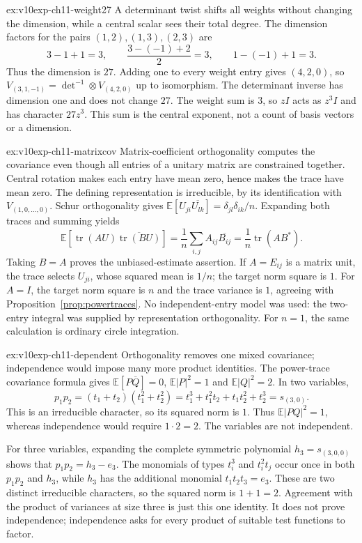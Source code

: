 \begin{solution}{ex:v10exp-ch11-weight27}
\idea A determinant twist shifts all weights without changing the dimension, while a central scalar sees their total degree.
\writeup The dimension factors for the pairs $(1,2),(1,3),(2,3)$ are
\[
 3-1+1=3,\qquad\frac{3-(-1)+2}{2}=3,\qquad1-(-1)+1=3.
\]
Thus the dimension is $27$. Adding one to every weight entry gives $(4,2,0)$, so $V_{(3,1,-1)}=\det^{-1}\otimes V_{(4,2,0)}$ up to isomorphism. The determinant inverse has dimension one and does not change $27$. The weight sum is $3$, so $zI$ acts as $z^3I$ and has character $27z^3$. This sum is the central exponent, not a count of basis vectors or a dimension.
\end{solution}

\begin{solution}{ex:v10exp-ch11-matrixcov}
\idea Matrix-coefficient orthogonality computes the covariance even though all entries of a unitary matrix are constrained together.
\writeup Central rotation makes each entry have mean zero, hence makes the trace have mean zero. The defining representation is irreducible, by its identification with $V_{(1,0,\ldots,0)}$. Schur orthogonality gives
$\mathbb E[U_{ji}\overline{U_{lk}}]=\delta_{jl}\delta_{ik}/n$. Expanding both traces and summing yields
\[
 \mathbb E[\operatorname{tr}(AU)\overline{\operatorname{tr}(BU)}]
  =\frac1n\sum_{i,j}A_{ij}\overline{B_{ij}}
  =\frac1n\operatorname{tr}(AB^*).
\]
Taking $B=A$ proves the unbiased-estimate assertion. If $A=E_{ij}$ is a matrix unit, the trace selects $U_{ji}$, whose squared mean is $1/n$; the target norm square is $1$. For $A=I$, the target norm square is $n$ and the trace variance is $1$, agreeing with Proposition~\ref{prop:powertraces}. No independent-entry model was used: the two-entry integral was supplied by representation orthogonality. For $n=1$, the same calculation is ordinary circle integration.
\end{solution}

\begin{solution}{ex:v10exp-ch11-dependent}
\idea Orthogonality removes one mixed covariance; independence would impose many more product identities.
\writeup The power-trace covariance formula gives $\mathbb E[P\overline Q]=0$, $\mathbb E|P|^2=1$ and $\mathbb E|Q|^2=2$. In two variables,
\[
 p_1p_2=(t_1+t_2)(t_1^2+t_2^2)
   =t_1^3+t_1^2t_2+t_1t_2^2+t_2^3=s_{(3,0)}.
\]
This is an irreducible character, so its squared norm is $1$. Thus $\mathbb E|PQ|^2=1$, whereas independence would require $1\cdot2=2$. The variables are not independent.

For three variables, expanding the complete symmetric polynomial $h_3=s_{(3,0,0)}$ shows that $p_1p_2=h_3-e_3$. The monomials of types $t_i^3$ and $t_i^2t_j$ occur once in both $p_1p_2$ and $h_3$, while $h_3$ has the additional monomial $t_1t_2t_3=e_3$. These are two distinct irreducible characters, so the squared norm is $1+1=2$. Agreement with the product of variances at size three is just this one identity. It does not prove independence; independence asks for every product of suitable test functions to factor.
\end{solution}

